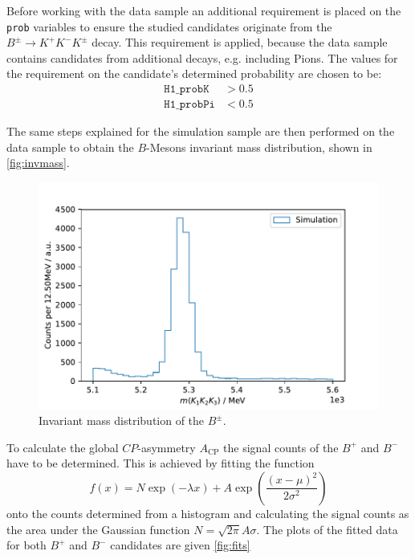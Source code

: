Before working with the data sample an additional requirement is placed 
on the \texttt{prob} variables to ensure the studied candidates originate 
from the $B^\pm \rightarrow K^+ K^- K^\pm$ decay. This requirement is applied, 
because the data sample contains candidates from additional decays, e.g. 
including Pions. The values for the requirement on the candidate's determined 
probability are chosen to be: 
\begin{align}
	\mathtt{H1\_probK} &> 0.5\\
	\mathtt{H1\_probPi} &< 0.5
\end{align}

The same steps explained for the simulation sample are then performed on the 
data sample to obtain the $B$-Mesons invariant mass distribution, shown in \autoref{fig:invmass}. 

\begin{figure}
	\centering
	\includegraphics[width=0.6\linewidth]{content/pictures/image_fin/invmass}
	\caption{Invariant mass distribution of the $B^\pm$.}
	\label{fig:invmass}
\end{figure}
To calculate the global $CP$-asymmetry $A_\mathrm{CP}$ the signal counts of the 
$B^+$ and $B^-$ have to be determined. This is achieved by fitting the function 
\begin{equation}
	f(x) = N\exp\left(-\lambda x\right) + A  \exp\left(\frac{(x-\mu)^2}{2\sigma^2}\right)
	\label{eq:fit}
\end{equation} 
onto the counts determined from a histogram and calculating the signal counts as 
the area under the Gaussian function $N=\sqrt{2\pi}A\sigma$. The plots of the 
fitted data for both $B^+$ and $B^-$ candidates are given \autoref{fig:fits}


